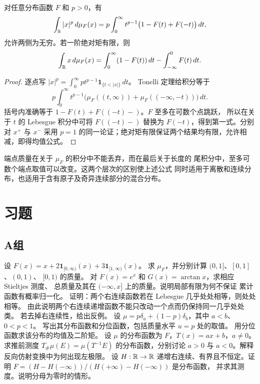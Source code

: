 \begin{proposition}\label{prop:stieltjes-tail-moments}
对任意分布函数 \(F\) 和 \(p>0\)，有
\begin{equation}\label{eq:stieltjes-tail-moment}
 \int_{\mathbb{R}} |x|^p\,d\mu_F(x)
 =p\int_0^\infty t^{p-1}\bigl(1-F(t)+F(-t)\bigr)\,dt,
\end{equation}
允许两侧为无穷。若一阶绝对矩有限，则
\[
 \int_{\mathbb{R}} x\,d\mu_F(x)
 =\int_0^\infty(1-F(t))\,dt-\int_{-\infty}^0F(t)\,dt.
\]
\end{proposition}
\begin{proof}
逐点写
\(|x|^p=\int_0^\infty pt^{p-1}\mathbf1_{\{t<|x|\}}\,dt\)。
Tonelli 定理给积分等于
\[
 p\int_0^\infty t^{p-1}
 \bigl(\mu_F((t,\infty))+\mu_F(({-\infty},-t))\bigr)\,dt.
\]
括号内准确等于 \(1-F(t)+F((-t)-)\)。\(F\) 至多在可数个点跳跃，
所以在关于 \(t\) 的 Lebesgue 积分中可将 \(F((-t)-)\) 替换为
\(F(-t)\)，得到第一式。分别对 \(x^+\) 与 \(x^-\) 采用 \(p=1\)
的同一论证；绝对矩有限保证两个结果均有限，允许相减，即得均值公式。
\end{proof}

端点质量在关于 \(\mu_F\) 的积分中不能丢弃，而在最后关于长度的
尾积分中，至多可数个端点取值可以改变。这两个层次的区别使上述公式
同时适用于离散和连续分布，也适用于含有原子及奇异连续部分的混合分布。

\section*{习题}
\subsection*{A组}
\begin{enumerate}[label=\textbf{\thechapter.\arabic*.}]
设 \(F(x)=x+2\mathbf1_{[0,\infty)}(x)+3\mathbf1_{[1,\infty)}(x)\)。
求 \(\mu_F\)，并分别计算 \((0,1]\)、\([0,1]\)、\((0,1)\)、
\([0,1)\) 的质量。
对 \(F(x)=e^x\) 和 \(G(x)=\arctan x\)，求相应 Stieltjes 测度、
总质量及其在 \(({-\infty},x]\) 上的质量。说明局部有限为何不保证
累计函数有概率归一化。
证明：两个右连续函数若在 Lebesgue 几乎处处相等，则处处相等。
由此说明两个右连续递增函数不能只改动一个点而仍保持同一几乎处处类。
若去掉右连续性，给出反例。
设 \(\mu=p\delta_a+(1-p)\delta_b\)，其中 \(a<b\)、\(0<p<1\)。
写出其分布函数和分位函数，包括质量水平 \(u=p\) 处的取值。
用分位函数求该分布的均值及二阶矩。
设 \(\mu\) 的分布函数为 \(F\)，\(T(x)=ax+b\)，\(a\ne0\)。
求推前测度 \(T_\#\mu(E)=\mu(T^{-1}E)\) 的分布函数，分别讨论
\(a>0\) 与 \(a<0\)。解释反向仿射变换中为何出现左极限。
设 \(H:\mathbb{R}\to\mathbb{R}\) 递增右连续、有界且不恒定。证明
\(F=(H-H(-\infty))/(H(+\infty)-H(-\infty))\) 是分布函数，
并求其测度。说明分母为零时的情形。
\end{enumerate}

